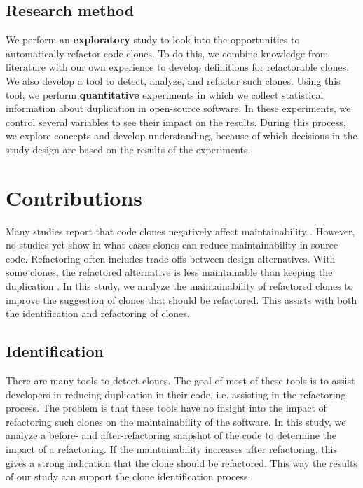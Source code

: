 \subsection{Research method}
We perform an \textbf{exploratory} study to look into the opportunities to automatically refactor code clones. To do this, we combine knowledge from literature with our own experience to develop definitions for refactorable clones. We also develop a tool to detect, analyze, and refactor such clones. Using this tool, we perform \textbf{quantitative} experiments in which we collect statistical information about duplication in open-source software. In these experiments, we control several variables to see their impact on the results. During this process, we explore concepts and develop understanding, because of which decisions in the study design are based on the results of the experiments.

\section{Contributions}
Many studies report that code clones negatively affect maintainability \cite{heitlager2007practical, monden2002software, juergens2009code, chatterji2013effects}. However, no studies yet show in what cases clones can reduce maintainability in source code. Refactoring often includes trade-offs between design alternatives. With some clones, the refactored alternative is less maintainable than keeping the duplication \cite{kapser2006cloning, aversano2007clones, hotta2010duplicate, kim2005empirical, krinke2007study, saha2010evaluating}. In this study, we analyze the maintainability of refactored clones to improve the suggestion of clones that should be refactored. This assists with both the identification and refactoring of clones.

\subsection{Identification}
There are many tools to detect clones. The goal of most of these tools is to assist developers in reducing duplication in their code, i.e. assisting in the refactoring process. The problem is that these tools have no insight into the impact of refactoring such clones on the maintainability of the software. In this study, we analyze a before- and after-refactoring snapshot of the code to determine the impact of a refactoring. If the maintainability increases after refactoring, this gives a strong indication that the clone should be refactored. This way the results of our study can support the clone identification process.

